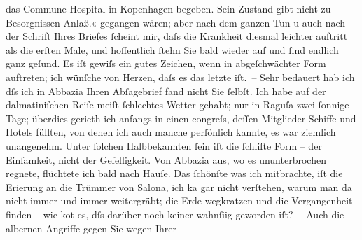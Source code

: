 \begin{ledgroupsized}[t]{13cm}
{{{                     das Commune-Hospital in
                        Kopenhagen begeben. Sein Zustand gibt nicht zu Besorgnissen
                     Anlaß.«}}}\label{K_L01034_1h} gegangen wären; aber nach dem ganzen Tun u auch nach der
               Schrift Ihres Briefes ſcheint mir, daſs die Krankheit diesmal leichter auftritt als
               die erſten Male, und hoffentlich ſtehn Sie bald wieder auf und ſind endlich ganz
               geſund. Es iſt gewiſs ein gutes Zeichen, wenn \label{K_L01034_2v}\label{K_L01034_2h} in abgeſchwächter Form auftreten; {\pb}ich wünſche von Herzen, daſs es das letzte iſt. –
               Sehr bedauert hab ich dſs ich in Abbazia Ihren
               Abſagebrief fand nicht Sie ſelbſt. Ich habe auf der dalmatiniſchen Reiſe meiſt ſchlechtes Wetter gehabt; nur in Raguſa zwei ſonnige Tage; überdies gerieth ich anfangs in einen
                  \label{K_L01034_3v}\label{K_L01034_3h}congreſs, deſſen Mitglieder Schiffe und Hotels füllten, von
               denen ich auch manche perſönlich kannte, es war ziemlich unangenehm. Unter ſolchen
                  Halb{\pb}bekannten ſein iſt die ſchli{\geminationm}ſte Form – der Einſamkeit, nicht der Geſelligkeit. Von
                  Abbazia aus, wo es ununterbrochen regnete,
               flüchtete ich bald nach Hauſe. Das ſchönſte was ich mitbrachte, iſt die Eri{\geminationn}erung an die Trümmer von Salona, ich ka{\geminationn} gar nicht verſtehen, warum man
               da nicht immer und immer weitergräbt; die Erde wegkratzen und die Vergangenheit
               finden – wie ko{\geminationm}t es, dſs darüber noch keiner wahnſi{\geminationn}ig {\pb}geworden
               iſt? –\pend
           \pstart
           Auch die albernen Angriffe gegen Sie wegen Ihrer \label{K_L01034_4v}
\end{ledgroupsized}
